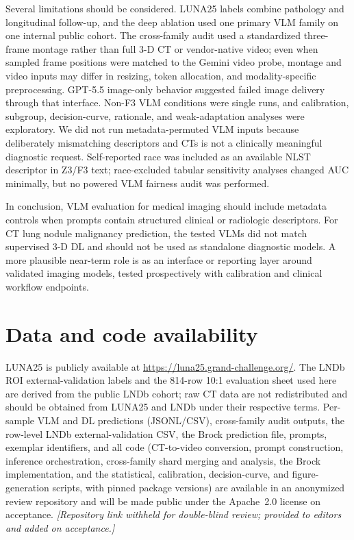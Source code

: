 \documentclass[11pt]{article}
\begin{document}
Several limitations should be considered. LUNA25 labels combine pathology and longitudinal follow-up, and the deep ablation used one primary VLM family on one internal public cohort. The cross-family audit used a standardized three-frame montage rather than full 3-D CT or vendor-native video; even when sampled frame positions were matched to the Gemini video probe, montage and video inputs may differ in resizing, token allocation, and modality-specific preprocessing. GPT-5.5 image-only behavior suggested failed image delivery through that interface. Non-F3 VLM conditions were single runs, and calibration, subgroup, decision-curve, rationale, and weak-adaptation analyses were exploratory. We did not run metadata-permuted VLM inputs because deliberately mismatching descriptors and CTs is not a clinically meaningful diagnostic request. Self-reported race was included as an available NLST descriptor in Z3/F3 text; race-excluded tabular sensitivity analyses changed AUC minimally, but no powered VLM fairness audit was performed.

In conclusion, VLM evaluation for medical imaging should include metadata controls when prompts contain structured clinical or radiologic descriptors. For CT lung nodule malignancy prediction, the tested VLMs did not match supervised 3-D DL and should not be used as standalone diagnostic models. A more plausible near-term role is as an interface or reporting layer around validated imaging models, tested prospectively with calibration and clinical workflow endpoints.

\section*{Data and code availability}
LUNA25 is publicly available at \url{https://luna25.grand-challenge.org/}. The LNDb ROI external-validation labels and the 814-row 10:1 evaluation sheet used here are derived from the public LNDb cohort; raw CT data are not redistributed and should be obtained from LUNA25 and LNDb under their respective terms. Per-sample VLM and DL predictions (JSONL/CSV), cross-family audit outputs, the row-level LNDb external-validation CSV, the Brock prediction file, prompts, exemplar identifiers, and all code (CT-to-video conversion, prompt construction, inference orchestration, cross-family shard merging and analysis, the Brock implementation, and the statistical, calibration, decision-curve, and figure-generation scripts, with pinned package versions) are available in an anonymized review repository and will be made public under the Apache~2.0 license on acceptance. \emph{[Repository link withheld for double-blind review; provided to editors and added on acceptance.]}
\end{document}
